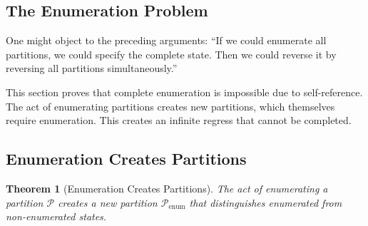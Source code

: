 \documentclass[twocolumn,10pt]{article}
\newtheorem{theorem}{Theorem}[section]
\theoremstyle{definition}
\theoremstyle{remark}
\begin{document}
\subsection{The Enumeration Problem}

One might object to the preceding arguments: ``If we could enumerate all partitions, we could specify the complete state. Then we could reverse it by reversing all partitions simultaneously.''

\vspace{0.2cm}
\noindent This section proves that complete enumeration is impossible due to self-reference. The act of enumerating partitions creates new partitions, which themselves require enumeration. This creates an infinite regress that cannot be completed.

\subsection{Enumeration Creates Partitions}

\begin{theorem}[Enumeration Creates Partitions]
\label{thm:enumeration_creates_partitions}
The act of enumerating a partition $\mathcal{P}$ creates a new partition $\mathcal{P}_{\text{enum}}$ that distinguishes enumerated from non-enumerated states.
\end{theorem}
\end{document}
